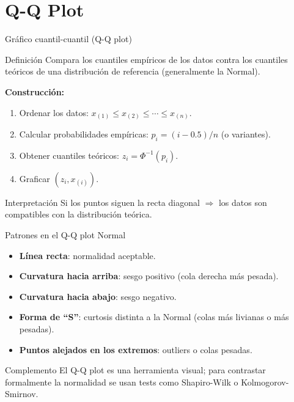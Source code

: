 \documentclass[aspectratio=169]{beamer}
\begin{document}
\section{Q-Q Plot}

\begin{frame}{Gráfico cuantil-cuantil (Q-Q plot)}
  \begin{block}{Definición}
    Compara los cuantiles empíricos de los datos contra los cuantiles teóricos de una distribución de referencia (generalmente la Normal).
  \end{block}
  \bigskip
  \textbf{Construcción:}
  \begin{enumerate}
    \item Ordenar los datos: $x_{(1)} \le x_{(2)} \le \cdots \le x_{(n)}$.
    \item Calcular probabilidades empíricas: $p_i = (i - 0.5)/n$ (o variantes).
    \item Obtener cuantiles teóricos: $z_i = \Phi^{-1}(p_i)$.
    \item Graficar $(z_i, x_{(i)})$.
  \end{enumerate}
  \bigskip
  \begin{alertblock}{Interpretación}
    Si los puntos siguen la recta diagonal $\Rightarrow$ los datos son compatibles con la distribución teórica.
  \end{alertblock}
\end{frame}

\begin{frame}{Patrones en el Q-Q plot Normal}
  \begin{itemize}
    \item \textbf{Línea recta}: normalidad aceptable.
    \item \textbf{Curvatura hacia arriba}: sesgo positivo (cola derecha más pesada).
    \item \textbf{Curvatura hacia abajo}: sesgo negativo.
    \item \textbf{Forma de ``S''}: curtosis distinta a la Normal (colas más livianas o más pesadas).
    \item \textbf{Puntos alejados en los extremos}: outliers o colas pesadas.
  \end{itemize}
  \bigskip
  \begin{exampleblock}{Complemento}
    El Q-Q plot es una herramienta visual; para contrastar formalmente la normalidad se usan tests como Shapiro-Wilk o Kolmogorov-Smirnov.
  \end{exampleblock}
\end{frame}
\end{document}
